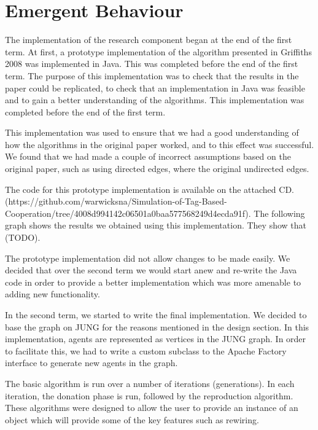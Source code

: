 \section{Emergent Behaviour}

The implementation of the research component began at the end of the first term. At first, a prototype implementation of the algorithm presented in Griffiths 2008 was implemented in Java. This was completed before the end of the first term. The purpose of this implementation was to check that the results in the paper could be replicated, to check that an implementation in Java was feasible and to gain a better understanding of the algorithms. This implementation was completed before the end of the first term.

This implementation was used to ensure that we had a good understanding of how the algorithms in the original paper worked, and to this effect was successful. We found that we had made a couple of incorrect assumptions based on the original paper, such as using directed edges, where the original undirected edges. 

The code for this prototype implementation is available on the attached CD. (https://github.com/warwicksna/Simulation-of-Tag-Based-Cooperation/tree/4008d994142c06501a0baa577568249d4ecda91f). The following graph shows the results we obtained using this implementation. They show that (TODO).

The prototype implementation did not allow changes to be made easily. We decided that over the second term we would start anew and re-write the Java code in order to provide a better implementation which was more amenable to adding new functionality.

In the second term, we started to write the final implementation. We decided to base the graph on JUNG for the reasons mentioned in the design section. In this implementation, agents are represented as vertices in the JUNG graph. In order to facilitate this, we had to write a custom subclass to the Apache Factory interface to generate new agents in the graph.

The basic algorithm is run over a number of iterations (generations). In each iteration, the donation phase is run, followed by the reproduction algorithm. These algorithms were designed to allow the user to provide an instance of an object which will provide some of the key features such as rewiring.

